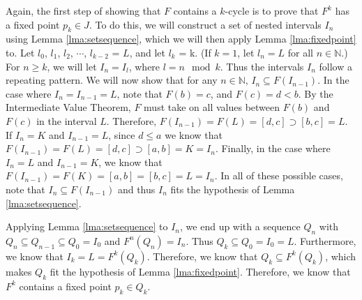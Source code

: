\documentclass[12pt]{IEEEtran}
\begin{document}

Again, the first step of showing that $F$ contains a $k$-cycle is to prove that $F^k$ has a fixed point $p_k \in J$. To do this, we will construct a set of nested intervals $I_n$  using Lemma \ref{lma:setsequence}, which we will then apply Lemma \ref{lma:fixedpoint} to. Let $l_0$, $l_1$, $l_2$, $\cdots$, $l_{k-2}$ = $L$, and let $l_k$ = k. (If $k=1$, let $l_n = L$ for all $n \in \mathbb{N}$.) For $n \geq k$, we will let $I_n = I_l$, where $l = n \mod k$. Thus the intervals $I_n$ follow a repeating pattern. We will now show that for any $n \in \mathbb{N}$, $I_n \subseteq F \left( I_{n-1} \right)$. In the case where $I_n = I_{n-1} = L$, note that $F \left( b \right) = c$, and $F \left( c \right) = d < b$. By the Intermediate Value Theorem, $F$ must take on all values between $F \left( b \right)$ and $F \left( c \right)$ in the interval $L$. Therefore, $F \left( I_{n-1} \right) = F \left( L \right) = [d, c] \supset \left[ b,c \right] = L$. If $I_n = K$ and $I_{n-1} = L$, since $d \leq a$ we know that $F \left( I_{n-1} \right) = F \left( L \right) = [d, c] \supset \left[ a,b \right] = K = I_n$. Finally, in the case where $I_n = L$ and $I_{n-1} = K$, we know that $F \left( I_{n-1} \right) = F \left( K \right) = [a, b] = \left[ b,c \right] = L = I_n$. In all of these possible cases, note that $I_n \subseteq F \left( I_{n-1} \right)$ and thus $I_n$ fits the hypothesis of Lemma \ref{lma:setsequence}.

Applying Lemma \ref{lma:setsequence} to $I_n$, we end up with a sequence $Q_n$ with $Q_n \subseteq Q_{n-1} \subseteq Q_0 = I_0$ and $F^n \left( Q_n \right) = I_n$. Thus $Q_k \subseteq Q_0 = I_0 = L$. Furthermore, we know that $I_k = L = F^k \left( Q_k \right)$. Therefore, we know that $Q_k \subseteq F^k \left( Q_k \right)$, which makes $Q_k$ fit the hypothesis of Lemma \ref{lma:fixedpoint}. Therefore, we know that $F^k$ contains a fixed point $p_k \in Q_k$.
\end{document}
